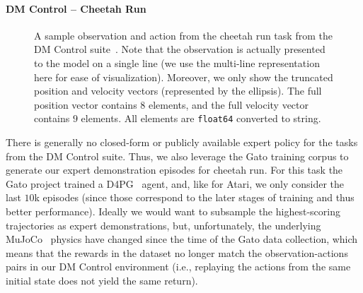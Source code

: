 \documentclass{article}
\newcommand{\ie}{i.e., }
\begin{document}
\paragraph{DM Control -- Cheetah Run}
\begin{figure}[t]
    \begin{center}
        \par\bigskip
    \end{center}
   \caption{
        A sample observation and action from the cheetah run task from the DM Control suite~\citep{tassa2018deepmind}.
        Note that the observation is actually presented to the model on a single line (we use the multi-line representation here for ease of visualization).
        Moreover, we only show the truncated position and velocity vectors (represented by the ellipsis).
        The full position vector contains $8$ elements, and the full velocity vector contains $9$ elements.
        All elements are \texttt{float64} converted to string.
    }
   \label{fig:observations-dm-control}
\end{figure}
There is generally no closed-form or publicly available expert policy for the tasks from the DM Control suite.
Thus, we also leverage the Gato training corpus to generate our expert demonstration episodes for cheetah run.
For this task the Gato project trained a D4PG~\citep{barth2018distributed} agent, and, like for Atari, we only consider the last $10$k episodes (since those correspond to the later stages of training and thus better performance).
Ideally we would want to subsample the highest-scoring trajectories as expert demonstrations, but, unfortunately, the underlying MuJoCo~\citep{todorov2012mujoco} physics have changed since the time of the Gato data collection, which means that the rewards in the dataset no longer match the observation-actions pairs in our DM Control environment (\ie replaying the actions from the same initial state does not yield the same return).
\end{document}
